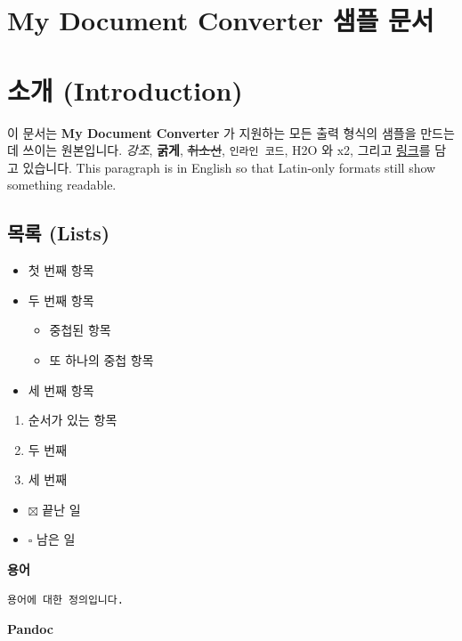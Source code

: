 \documentclass[11pt]{article}
\date{}
\begin{document}
\section*{My Document Converter 샘플 문서}\label{my-document-converter-샘플-문서}

\section*{소개 (Introduction)}\label{소개-introduction}

이 문서는 \textbf{My Document Converter} 가 지원하는 모든 출력 형식의 샘플을 만드는 데 쓰이는
원본입니다.
\emph{강조}, \textbf{굵게}, \sout{취소선}, \verb|인라인 코드|, H2O 와 x2, 그리고
\href{https://example.com}{링크}를 담고 있습니다. This paragraph is in
English so that Latin-only formats still show something readable.

\subsection*{목록 (Lists)}\label{목록-lists}

\begin{itemize}
\item 첫 번째 항목
\item 두 번째 항목
\begin{itemize}
\item 중첩된 항목
\item 또 하나의 중첩 항목
\end{itemize}
\item 세 번째 항목
\end{itemize}

\begin{enumerate}
\item 순서가 있는 항목
\item 두 번째
\item 세 번째
\end{enumerate}

\begin{itemize}
\item $\boxtimes$ 끝난 일
\item $\square$ 남은 일
\end{itemize}

\textbf{용어}

\begin{verbatim}
용어에 대한 정의입니다.
\end{verbatim}

\textbf{Pandoc}
\end{document}
